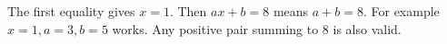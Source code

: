 The first equality gives $x=1$. Then $ax+b=8$ means $a+b=8$. For example $\boxed{x=1,a=3,b=5}$ works. Any positive pair summing to $8$ is also valid.

